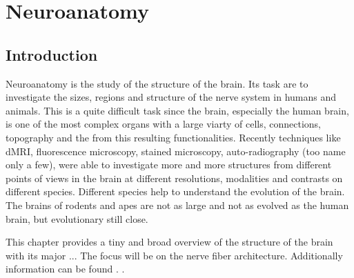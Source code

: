 \setcounter{chapter}{1}
\chapter{Neuroanatomy}
\label{chap:neuro}
% 

%
\section{Introduction}
% 
Neuroanatomy is the study of the structure of the brain.
Its task are to investigate the sizes, regions and structure of the nerve system in humans and animals.
This is a quite difficult task since the brain, especially the human brain, is one of the most complex organs with a large viarty of cells, connections, topography and the from this resulting functionalities.
Recently techniques like \ac{dMRI}, fluorescence microscopy, stained microscopy, auto-radiography (too name only a few), were able to investigate more and more structures from different points of views in the brain at different resolutions, modalities and contrasts on different species.
Different species help to understand the evolution of the brain. The brains of rodents and apes are not as large and not as evolved as the human brain, but evolutionary still close.
\par
This chapter provides a tiny and broad overview of the structure of the brain with its major ...
The focus will be on the nerve fiber architecture.
Additionally information can be found \eg{} \dummy{}.
.
%
% 
% 
